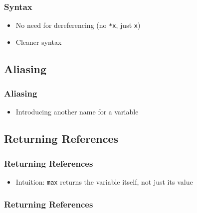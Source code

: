 \begin{frame}
  \frametitle{Syntax}
  \begin{itemize}
    \item No need for dereferencing (no \texttt{*x}, just \texttt{x})
    \item Cleaner syntax
  \end{itemize}
\end{frame}

\subsection{Aliasing}
\frame{\tableofcontents[currentsubsection]}


\begin{frame}
  \frametitle{Aliasing}
  \begin{itemize}
    \item Introducing another name for a variable
  \end{itemize}
  \vskip5mm
  \begin{overprint}

  \end{overprint}
\end{frame}

\subsection{Returning References}
\frame{\tableofcontents[currentsubsection]}

\begin{frame}
  \frametitle{Returning References}
  \begin{itemize}
    \item Intuition: \texttt{max} returns the variable itself, not just its value
  \end{itemize}
\end{frame}

\begin{frame}
  \frametitle{Returning References}
\end{frame}


